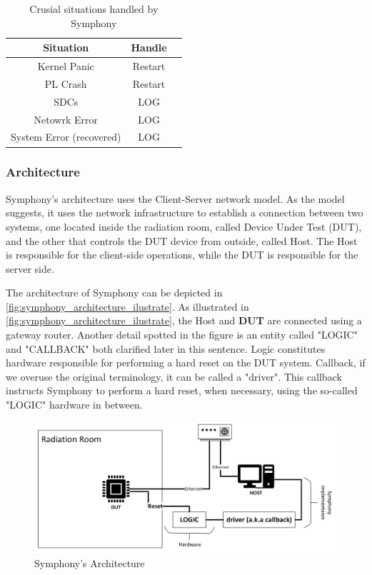 \begin{table}[h!]
\begin{center}
\begin{tabular}{ |c|c|c| } 
\hline
Situation & Handle \\
\hline
Kernel Panic & Restart \\ 
PL Crash & Restart \\  
SDCs  & LOG \\
Netowrk Error & LOG \\
System Error (recovered) & LOG \\

\hline
\end{tabular}
\caption{Crusial situations handled by Symphony}
\label{tab:symphony_handle}
\end{center}
\end{table}

\subsubsection{Architecture}
Symphony's architecture uses the Client-Server network model. As the model suggests, it uses the network infrastructure to establish a connection between two systems, one located inside the radiation room, called Device Under Test (DUT), and the other that controls the DUT device from outside, called Host. The Host is responsible for the client-side operations, while the DUT is responsible for the server side.

The architecture of Symphony can be depicted in \autoref{fig:symphony_architecture_ilustrate}. As illustrated in \autoref{fig:symphony_architecture_ilustrate}, the Host and \textbf{DUT} are connected using a gateway router. Another detail spotted in the figure is an entity called "LOGIC" and "CALLBACK" both clarified later in this sentence.  Logic constitutes hardware responsible for performing a hard reset on the DUT system. Callback, if we overuse the original terminology, it can be called a "driver". This callback instructs Symphony to perform a hard reset, when necessary, using the so-called "LOGIC" hardware in between. 

\begin{figure}[h]
\includegraphics[width=\textwidth]{images/symphony.png}
\centering
\caption{Symphony's Architecture}
\label{fig:symphony_architecture_ilustrate}
\end{figure}

